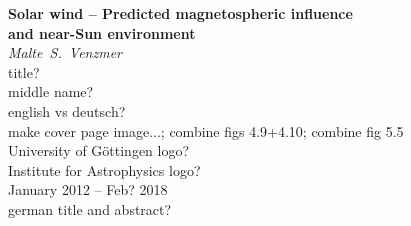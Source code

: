 \begin{titlepage}
	\begin{center}
		{\LARGE\sffamily
			\textbf{Solar wind -- Predicted magnetospheric influence\\and near-Sun environment}\\
		}
		\Large
		\textit{Malte~S.~Venzmer}\\
		title?\\
		middle name?\\
		english vs deutsch?\\
		make cover page image...; combine figs 4.9+4.10; combine fig 5.5\\
		University of Göttingen logo?\\
		Institute for Astrophysics logo?\\
		January 2012 -- Feb? 2018\\
		german title and abstract?\\
	\end{center}

\vfill


\end{titlepage}
